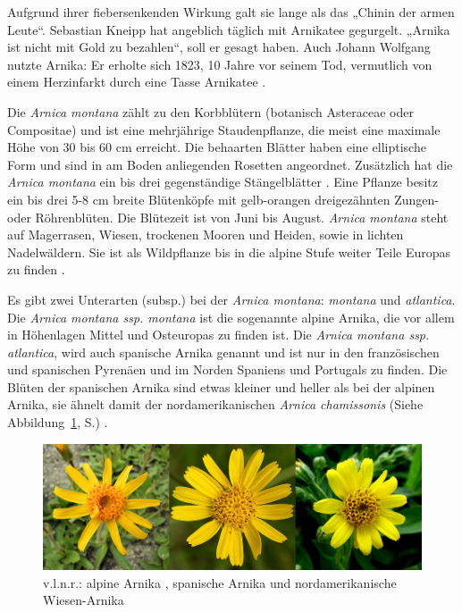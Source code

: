 Aufgrund ihrer fiebersenkenden Wirkung galt sie lange als das „Chinin der armen Leute“. Sebastian Kneipp hat angeblich täglich mit Arnikatee gegurgelt. „Arnika ist nicht mit Gold zu bezahlen“, soll er gesagt haben. Auch Johann Wolfgang nutzte Arnika: Er erholte sich 1823, 10 Jahre vor seinem Tod, vermutlich von einem Herzinfarkt durch eine Tasse Arnikatee \citep[vgl.][S.56]{Franke2012}.

Die \textit{Arnica montana} zählt zu den Korbblütern (botanisch Asteraceae oder Compositae) und ist eine mehrjährige Staudenpflanze, die meist eine maximale Höhe von 30 bis 60 cm erreicht. Die behaarten Blätter haben eine elliptische Form und sind in am Boden anliegenden Rosetten angeordnet. Zusätzlich hat die \textit{Arnica montana} ein bis drei gegenständige Stängelblätter \citep[vgl.][]{Wyk2015, FNR2013}. Eine Pflanze besitz ein bis drei 5-8 cm breite Blütenköpfe mit gelb-orangen dreigezähnten Zungen- oder Röhrenblüten. Die Blütezeit ist von Juni bis August. \textit{Arnica montana} steht auf Magerrasen, Wiesen, trockenen Mooren und Heiden, sowie in lichten Nadelwäldern. Sie ist als Wildpflanze bis in die alpine Stufe weiter Teile Europas zu finden \citep[vgl.][]{Schoenfelder2011, FNR2013}.

Es gibt zwei Unterarten (subsp.) bei der \textit{Arnica montana}: \textit{montana} und \textit{atlantica}. Die \textit{Arnica montana ssp. montana} ist die sogenannte alpine Arnika, die vor allem in Höhenlagen Mittel und Osteuropas zu finden ist. Die \textit{Arnica montana ssp. atlantica}, wird auch spanische Arnika genannt und ist nur in den französischen und spanischen Pyrenäen und im Norden Spaniens und Portugals zu finden. Die Blüten der spanischen Arnika sind etwas kleiner und heller als bei der alpinen Arnika, sie ähnelt damit der nordamerikanischen \textit{Arnica chamissonis} (Siehe Abbildung~\ref{fig:Unterarten}, S.\pageref{fig:Unterarten}) \citep[vgl.][S. 61]{Franke2012}.

\begin{figure}[htb]
 \centering
 \includegraphics[width=\textwidth,angle=0]{abb/Arnika/arnica-900x300}
 \caption{v.l.n.r.: alpine Arnika \citep{Moro2019}, spanische Arnika \citep{Pereira2019} und nordamerikanische Wiesen-Arnika \citep{Rowlin2019}}
\label{fig:Unterarten}
\end{figure}

